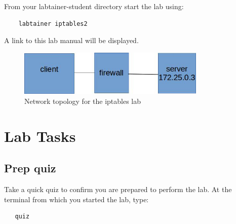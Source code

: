 From your labtainer-student directory start the lab using:
\begin{verbatim}
    labtainer iptables2
\end{verbatim}
\noindent A link to this lab manual will be displayed.  


\begin{figure}[H]
\begin{center}
\includegraphics [width=0.8\textwidth]{iptables.jpg}
\end{center}
\caption{Network topology for the iptables lab}
\label{fig:topology}
\end{figure}

\section{Lab Tasks}
\subsection{Prep quiz}
Take a quick quiz to confirm you are prepared to perform the lab.
At the terminal from which you started the lab, type: 
\begin{verbatim}
   quiz
\end{verbatim}
